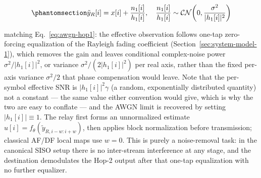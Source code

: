 \begin{equation}\protect\phantomsection\label{eq:relay-received-siso}{\tilde{y}_R[i] = x[i] + \frac{n_1[i]}{h_1[i]}, \quad \frac{n_1[i]}{h_1[i]} \sim \mathcal{CN}\!\left(0, \frac{\sigma^2}{|h_1[i]|^2}\right)
}\end{equation}

matching Eq.~\eqref{eq:awgn-hop1}: the effective observation follows one-tap zero-forcing equalization of the Rayleigh fading coefficient (Section~\ref{sec:system-model-1}), which removes the gain and leaves conditional complex-noise power $\sigma^{2}/|h_1[i]|^{2}$, or variance $\sigma^{2}/(2|h_1[i]|^{2})$ per real axis, rather than the fixed per-axis variance $\sigma^{2}/2$ that phase compensation would leave. Note that the per-symbol effective SNR is \(|h_1[i]|^2\gamma\) (a random, exponentially distributed quantity) not a constant --- the same value either convention would give, which is why the two are easy to conflate --- and the AWGN limit is recovered by setting \(|h_1[i]| \equiv 1\). The relay first forms an unnormalized estimate \(u[i] = f_\theta(\tilde{y}_{R,i-w:i+w})\), then applies block normalization before transmission; classical AF/DF local maps use \(w=0\). This is purely a noise-removal task: in the canonical SISO setup there is no inter-stream interference at any stage, and the destination demodulates the Hop-2 output after that one-tap equalization with no further equalizer.

